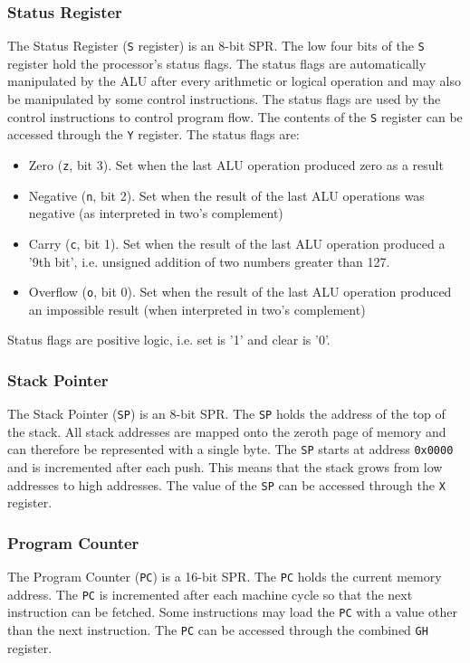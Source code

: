 \documentclass[a4paper,12pt]{article}
\newcommand{\Gr}{\texttt{G}}
\newcommand{\Hr}{\texttt{H}}
\newcommand{\Xr}{\texttt{X}}
\newcommand{\Yr}{\texttt{Y}}
\newcommand{\Sr}{\texttt{S}}
\newcommand{\SP}{\texttt{SP}}
\newcommand{\PC}{\texttt{PC}}
\begin{document}
\subsubsection{Status Register}
The Status Register (\Sr{} register) is an 8-bit SPR. The low four bits of the
\Sr{} register hold the processor's status flags. The status flags are 
automatically manipulated by the ALU after every arithmetic or logical operation
and may also be manipulated by some control instructions. The status flags are
used by the control instructions to control program flow. The contents of the 
\Sr{} register can be accessed through the \Yr{} register. The status flags are:
\begin{itemize}
\item Zero (\texttt{z}, bit 3). Set when the last ALU operation produced zero as
a result
\item Negative (\texttt{n}, bit 2). Set when the result of the last ALU 
operations was negative (as interpreted in two's complement)
\item Carry (\texttt{c}, bit 1). Set when the result of the last ALU operation
produced a '9th bit', i.e. unsigned addition of two numbers greater than 127.
\item Overflow (\texttt{o}, bit 0). Set when the result of the last ALU 
operation produced an impossible result (when interpreted in two's complement)
\end{itemize}
Status flags are positive logic, i.e. set is '1' and clear is '0'.
\par

\subsubsection{Stack Pointer}
The Stack Pointer (\SP{}) is an 8-bit SPR. The \SP{} holds the address of the 
top of the stack. All stack addresses are mapped onto the zeroth page of memory
and can therefore be represented with a single byte. The \SP{} starts at 
address \texttt{0x0000} and is incremented after each push. This means that the 
stack grows from low addresses to high addresses. The value of the \SP{} can be 
accessed through the \Xr{} register.
\par

\subsubsection{Program Counter}
The Program Counter (\PC{}) is a 16-bit SPR. The \PC{} holds the current memory
address. The \PC{} is incremented after each machine cycle so that the next 
instruction can be fetched. Some instructions may load the \PC{} with a value
other than the next instruction. The \PC{} can be accessed through the combined
\Gr{}\Hr{} register.
\par
\end{document}
